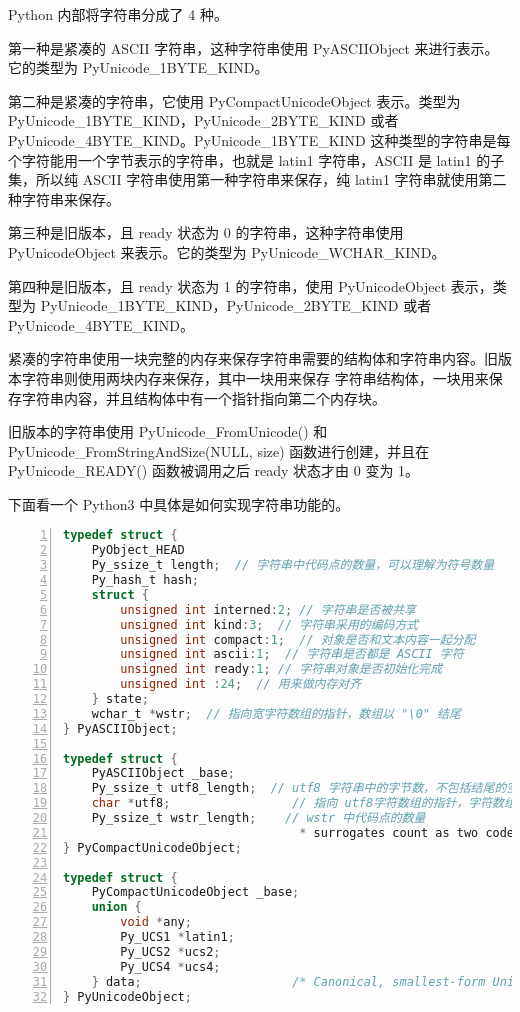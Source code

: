 Python 内部将字符串分成了 4 种。

第一种是紧凑的 ASCII 字符串，这种字符串使用 PyASCIIObject 来进行表示。它的类型为 PyUnicode\_1BYTE\_KIND。

第二种是紧凑的字符串，它使用 PyCompactUnicodeObject 表示。类型为 PyUnicode\_1BYTE\_KIND，PyUnicode\_2BYTE\_KIND
或者 PyUnicode\_4BYTE\_KIND。PyUnicode\_1BYTE\_KIND 这种类型的字符串是每个字符能用一个字节表示的字符串，也就是 latin1
字符串，ASCII 是 latin1 的子集，所以纯 ASCII 字符串使用第一种字符串来保存，纯 latin1 字符串就使用第二种字符串来保存。

第三种是旧版本，且 ready 状态为 0 的字符串，这种字符串使用 PyUnicodeObject 来表示。它的类型为 PyUnicode\_WCHAR\_KIND。

第四种是旧版本，且 ready 状态为 1 的字符串，使用 PyUnicodeObject 表示，类型为 PyUnicode\_1BYTE\_KIND，PyUnicode\_2BYTE\_KIND
或者 PyUnicode\_4BYTE\_KIND。

紧凑的字符串使用一块完整的内存来保存字符串需要的结构体和字符串内容。旧版本字符串则使用两块内存来保存，其中一块用来保存
字符串结构体，一块用来保存字符串内容，并且结构体中有一个指针指向第二个内存块。

旧版本的字符串使用 PyUnicode\_FromUnicode() 和 PyUnicode\_FromStringAndSize(NULL, size) 函数进行创建，并且在 PyUnicode\_READY()
函数被调用之后 ready 状态才由 0 变为 1。


下面看一个 Python3 中具体是如何实现字符串功能的。

\begin{lstlisting}[language=C, numbers=left, numbersep=1em, numberstyle=\footnotesize , breaklines=true]
typedef struct {
    PyObject_HEAD
    Py_ssize_t length;  // 字符串中代码点的数量，可以理解为符号数量
    Py_hash_t hash;
    struct {
        unsigned int interned:2; // 字符串是否被共享
        unsigned int kind:3;  // 字符串采用的编码方式
        unsigned int compact:1;  // 对象是否和文本内容一起分配
        unsigned int ascii:1;  // 字符串是否都是 ASCII 字符
        unsigned int ready:1; // 字符串对象是否初始化完成
        unsigned int :24;  // 用来做内存对齐
    } state;
    wchar_t *wstr;  // 指向宽字符数组的指针，数组以 "\0" 结尾
} PyASCIIObject;

typedef struct {
    PyASCIIObject _base;
    Py_ssize_t utf8_length;  // utf8 字符串中的字节数，不包括结尾的空字符
    char *utf8;                 // 指向 utf8字符数组的指针，字符数组以 \0 结尾
    Py_ssize_t wstr_length;    // wstr 中代码点的数量
                                 * surrogates count as two code points. */
} PyCompactUnicodeObject;

typedef struct {
    PyCompactUnicodeObject _base;
    union {
        void *any;
        Py_UCS1 *latin1;
        Py_UCS2 *ucs2;
        Py_UCS4 *ucs4;
    } data;                     /* Canonical, smallest-form Unicode buffer */
} PyUnicodeObject;
\end{lstlisting}

